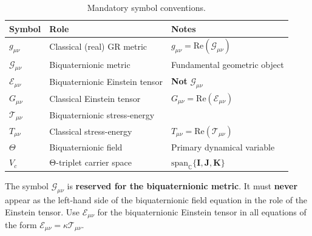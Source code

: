 \begin{table}[h]
  \centering
  \caption{Mandatory symbol conventions.}
  \label{tab:symbol_conventions}
  \begin{tabular}{lll}
    \hline
    Symbol & Role & Notes \\
    \hline
    $g_{\mu\nu}$ & Classical (real) GR metric & $g_{\mu\nu} = \mathrm{Re}(\mathcal{G}_{\mu\nu})$ \\
    $\mathcal{G}_{\mu\nu}$ & Biquaternionic metric & Fundamental geometric object \\
    $\mathcal{E}_{\mu\nu}$ & Biquaternionic Einstein tensor & \textbf{Not} $\mathcal{G}_{\mu\nu}$ \\
    $G_{\mu\nu}$ & Classical Einstein tensor & $G_{\mu\nu}=\mathrm{Re}(\mathcal{E}_{\mu\nu})$ \\
    $\mathcal{T}_{\mu\nu}$ & Biquaternionic stress-energy & \\
    $T_{\mu\nu}$ & Classical stress-energy & $T_{\mu\nu}=\mathrm{Re}(\mathcal{T}_{\mu\nu})$ \\
    $\Theta$ & Biquaternionic field & Primary dynamical variable \\
    $V_c$ & Θ-triplet carrier space & $\mathrm{span}_\mathbb{C}\{\mathbf{I},\mathbf{J},\mathbf{K}\}$ \\
    \hline
  \end{tabular}
\end{table}

\begin{tcolorbox}[colback=red!5!white,colframe=red!75!black,title=Enforced Prohibition]
  The symbol $\mathcal{G}_{\mu\nu}$ is \textbf{reserved for the biquaternionic
  metric}.  It must \textbf{never} appear as the left-hand side of the
  biquaternionic field equation in the role of the Einstein tensor.
  Use $\mathcal{E}_{\mu\nu}$ for the biquaternionic Einstein tensor in all
  equations of the form $\mathcal{E}_{\mu\nu} = \kappa\mathcal{T}_{\mu\nu}$.
\end{tcolorbox}

